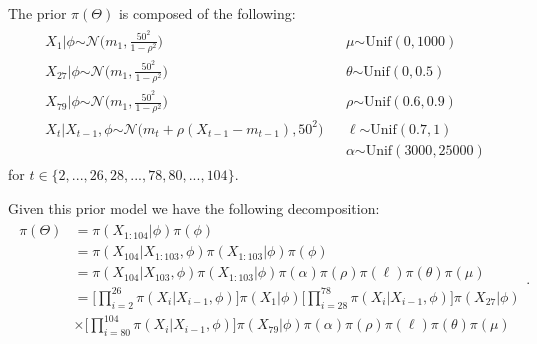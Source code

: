 \documentclass[letterpaper,10pt,english]{sphinxmanual}
\begin{document}
The prior \(\pi(\Theta)\) is composed of the following:
\begin{equation*}
\begin{split}\begin{aligned}
& X_{1}|\phi \stackrel{}{\sim} \mathcal{N}\Big(m_{1} ,\frac{50^2}{1-\rho^2}\Big) & & \mu \stackrel{}{\sim} \mbox{Unif}(0,1000) \\
& X_{27}|\phi \stackrel{}{\sim} \mathcal{N}\Big(m_{1} ,\frac{50^2}{1-\rho^2}\Big) & & \theta \stackrel{}{\sim} \mbox{Unif}(0,0.5)  \\
& X_{79}|\phi \stackrel{}{\sim} \mathcal{N}\Big(m_{1} ,\frac{50^2}{1-\rho^2}\Big) & & \rho \stackrel{}{\sim} \mbox{Unif}(0.6,0.9) \\
& X_{t}|X_{t-1}, \phi \stackrel{}{\sim} \mathcal{N}\Big(m_{t} + \rho(X_{t-1}-m_{t-1}), 50^2\Big) & & \ell \stackrel{}{\sim} \mbox{Unif}(0.7,1) \\
&      && \alpha \stackrel{}{\sim} \mbox{Unif}(3000,25000)\end{aligned}\end{split}
\end{equation*}
for \(t \in \{2,...,26,28,...,78,80,...,104\}\).

Given this prior model we have the following decomposition:
\begin{equation*}
\begin{split}\begin{aligned}
 \pi(\Theta)  &=  \pi(X_{1:104}|\phi)\pi(\phi) \\
 &= \pi(X_{104}|X_{1:103},\phi)\pi(X_{1:103}|\phi)\pi(\phi) \\
 &= \pi(X_{104}|X_{103},\phi)\pi(X_{1:103}|\phi)\pi(\alpha)\pi(\rho)\pi(\ell)\pi(\theta)\pi(\mu)\\
 &= \bigg[\prod_{i=2}^{26}\pi(X_{i}|X_{i-1},\phi)\bigg]\pi(X_{1}|\phi)\bigg[\prod_{i=28}^{78}\pi(X_{i}|X_{i-1},\phi)\bigg]\pi(X_{27}|\phi)\\
 &\times \bigg[\prod_{i=80}^{104}\pi(X_{i}|X_{i-1},\phi)\bigg]\pi(X_{79}|\phi)
\pi(\alpha)\pi(\rho)\pi(\ell)\pi(\theta)\pi(\mu)\end{aligned}.\end{split}
\end{equation*}
\end{document}
